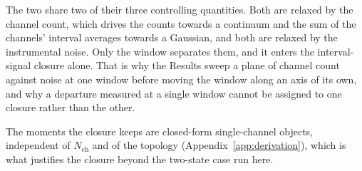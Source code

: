 \begin{tcolorbox}[title={The two Gaussian approximations}, colback=gray!5, colframe=gray!55]
\smallskip
The two share two of their three controlling quantities. Both are relaxed by the channel count,
which drives the counts towards a continuum and the sum of the channels' interval averages
towards a Gaussian, and both are relaxed by the instrumental noise. Only the window separates
them, and it enters the interval-signal closure alone. That is why the Results sweep a plane of
channel count against noise at one window before moving the window along an axis of its own, and
why a departure measured at a single window cannot be assigned to one closure rather than the
other.
\end{tcolorbox}

The moments the closure keeps are closed-form single-channel objects, independent of
$N_{\mathrm{ch}}$ and of the topology (Appendix~\ref{app:derivation}), which is what justifies the
closure beyond the two-state case run here.

